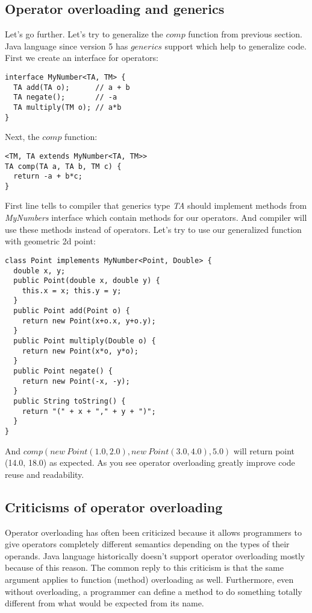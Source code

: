 \documentclass{aircc}
\begin{document}
\subsection{Operator overloading and generics}
Let's go further. 
Let's try to generalize the $comp$ function from previous section.
Java language since version 5 has $generics$ support which help to generalize code.
First we create an interface for operators:
\begin{lstlisting}
interface MyNumber<TA, TM> {
  TA add(TA o);      // a + b
  TA negate();       // -a
  TA multiply(TM o); // a*b
}
\end{lstlisting}
Next, the $comp$ function:
\begin{lstlisting}
<TM, TA extends MyNumber<TA, TM>>
TA comp(TA a, TA b, TM c) {
  return -a + b*c;
}
\end{lstlisting}
First line tells to compiler that generics type \textit{TA} should implement methods from \textit{MyNumbers} interface which contain methods for our operators. And compiler will use these methods instead of operators.
Let's try to use our generalized function with geometric 2d point:
\begin{lstlisting}
class Point implements MyNumber<Point, Double> {
  double x, y;
  public Point(double x, double y) {
    this.x = x; this.y = y;
  }
  public Point add(Point o) {
    return new Point(x+o.x, y+o.y);
  }
  public Point multiply(Double o) {
    return new Point(x*o, y*o);
  }
  public Point negate() {
    return new Point(-x, -y);
  }
  public String toString() {
    return "(" + x + "," + y + ")";
  }
}
\end{lstlisting}
And $comp(new~Point(1.0,2.0), new~Point(3.0,4.0), 5.0)$ will return point (14.0, 18.0) as expected.
As you see operator overloading greatly improve code reuse and readability.

\subsection{Criticisms of operator overloading}
Operator overloading has often been criticized because it allows programmers to give operators completely different semantics depending on the types of their operands.
Java language historically doesn't support operator overloading mostly because of this reason.
The common reply to this criticism is that the same argument applies to function (method) overloading as well. 
Furthermore, even without overloading, a programmer can define a method to do something totally different from what would be expected from its name.
\end{document}
